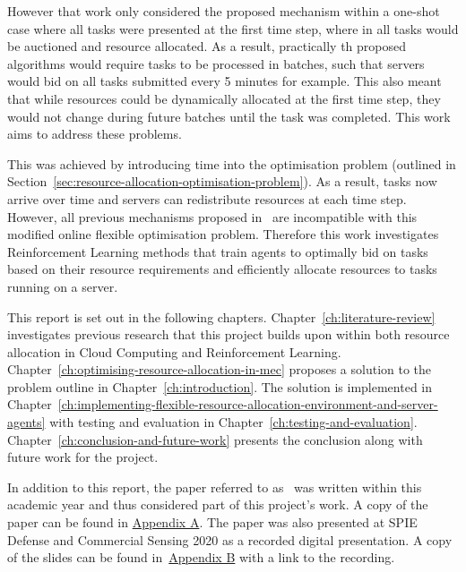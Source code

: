 However that work only considered the proposed mechanism within a one-shot case where all tasks were presented at the
first time step, where in all tasks would be auctioned and resource allocated. As a result, practically th proposed
algorithms would require tasks to be processed in batches, such that servers would bid on all tasks submitted every 5
minutes for example. This also meant that while resources could be dynamically allocated at the first time step, they
would not change during future batches until the task was completed. This work aims to address these problems.

This was achieved by introducing time into the optimisation problem (outlined in
Section~\ref{sec:resource-allocation-optimisation-problem}). As a result, tasks now arrive over time and servers can
redistribute resources at each time step. However, all previous mechanisms proposed in~\cite{FlexibleResourceAllocation}
are incompatible with this modified online flexible optimisation problem. Therefore this work investigates Reinforcement
Learning methods that train agents to optimally bid on tasks based on their resource requirements and efficiently
allocate resources to tasks running on a server.

This report is set out in the following chapters. Chapter~\ref{ch:literature-review} investigates previous research
that this project builds upon within both resource allocation in Cloud Computing and Reinforcement Learning.
Chapter~\ref{ch:optimising-resource-allocation-in-mec} proposes a solution to the problem outline in
Chapter~\ref{ch:introduction}.
The solution is implemented in Chapter~\ref{ch:implementing-flexible-resource-allocation-environment-and-server-agents}
with testing and evaluation in Chapter~\ref{ch:testing-and-evaluation}. Chapter~\ref{ch:conclusion-and-future-work}
presents the conclusion along with future work for the project.

In addition to this report, the paper referred to as~\cite{FlexibleResourceAllocation} was written within this
academic year and thus considered part of this project's work. A copy of the paper can be found in
\hyperref[app:paper]{Appendix A}. The paper was also presented at SPIE Defense and Commercial
Sensing 2020 as a recorded digital presentation. A copy of the slides can be found
in~\hyperref[app:spie-presentation]{Appendix B} with a link to the recording.
